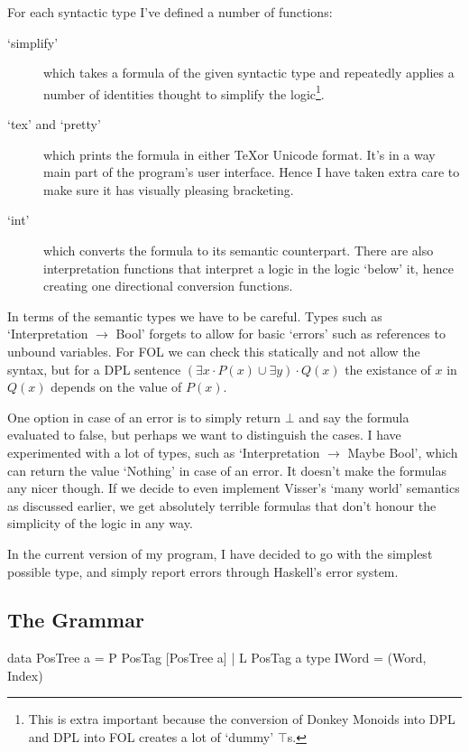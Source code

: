 \documentclass[12pt]{article}
\begin{document}
For each syntactic type I've defined a number of functions:
\begin{description}
\item[`simplify'] which takes a formula of the given syntactic type and repeatedly applies a number of identities thought to simplify the logic\footnote{This is extra important because the conversion of Donkey Monoids into DPL and DPL into FOL creates a lot of `dummy' $\top$s.}.
\item[`tex' and `pretty'] which prints the formula in either \TeX or Unicode format. It's in a way main part of the program's user interface. Hence I have taken extra care to make sure it has visually pleasing bracketing.
\item[`int'] which converts the formula to its semantic counterpart. There are also interpretation functions that interpret a logic in the logic `below' it, hence creating one directional conversion functions.
\end{description}

In terms of the semantic types we have to be careful. Types such as `Interpretation $\rightarrow$ Bool' forgets to allow for basic `errors' such as references to unbound variables. For FOL we can check this statically and not allow the syntax, but for a DPL sentence $(\exists x\cdot P(x) \cup \exists y)\cdot Q(x)$ the existance of $x$ in $Q(x)$ depends on the value of $P(x)$.

One option in case of an error is to simply return $\bot$ and say the formula evaluated to false, but perhaps we want to distinguish the cases. I have experimented with a lot of types, such as `Interpretation $\rightarrow$ Maybe Bool', which can return the value `Nothing' in case of an error. It doesn't make the formulas any nicer though. If we decide to even implement Visser's `many world' semantics as discussed earlier, we get absolutely terrible formulas that don't honour the simplicity of the logic in any way.

In the current version of my program, I have decided to go with the simplest possible type, and simply report errors through Haskell's error system.

\subsection{The Grammar}

\newsavebox{\LstBox}
\begin{lrbox}{\LstBox}
\begin{haskell}
data PosTree a = P PosTag [PosTree a] | L PosTag a
type IWord = (Word, Index)
\end{haskell}
\end{lrbox}
\end{document}
